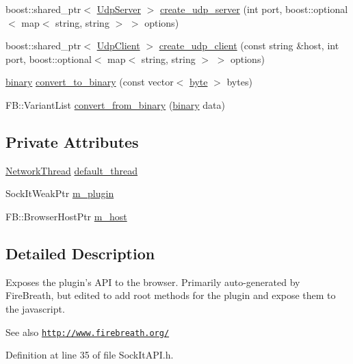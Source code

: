 \begin{DoxyCompactItemize}
\item 
boost::shared\_\-ptr$<$ \hyperlink{classUdpServer}{UdpServer} $>$ \hyperlink{classSockItAPI_afede6ca76e58e088b3262b02bb47d1a0}{create\_\-udp\_\-server} (int port, boost::optional$<$ map$<$ string, string $>$ $>$ options)
\item 
boost::shared\_\-ptr$<$ \hyperlink{classUdpClient}{UdpClient} $>$ \hyperlink{classSockItAPI_a459c942a85f434e96dec5cdff753ed3a}{create\_\-udp\_\-client} (const string \&host, int port, boost::optional$<$ map$<$ string, string $>$ $>$ options)
\item 
\hyperlink{Event_8h_a42e68af8ed186972f3b40e079e28dfb1}{binary} \hyperlink{classSockItAPI_a5eac49bd5ad0cb5320cbc325a0e997be}{convert\_\-to\_\-binary} (const vector$<$ \hyperlink{Event_8h_ae0aa21f6bcb621fe36c2c962aa0452fe}{byte} $>$ bytes)
\item 
FB::VariantList \hyperlink{classSockItAPI_a4e507273c91d6509be9133a34c32ed3c}{convert\_\-from\_\-binary} (\hyperlink{Event_8h_a42e68af8ed186972f3b40e079e28dfb1}{binary} data)
\end{DoxyCompactItemize}
\subsection*{Private Attributes}
\begin{DoxyCompactItemize}
\item 
\hyperlink{classNetworkThread}{NetworkThread} \hyperlink{classSockItAPI_adcfb54795f58d245c1b8ea8311a7d456}{default\_\-thread}
\item 
SockItWeakPtr \hyperlink{classSockItAPI_ac973fa980fa71d06190969448621beea}{m\_\-plugin}
\item 
FB::BrowserHostPtr \hyperlink{classSockItAPI_afb9c76de5331308b066e969d9a35d236}{m\_\-host}
\end{DoxyCompactItemize}


\subsection{Detailed Description}
Exposes the plugin's API to the browser. Primarily auto-\/generated by FireBreath, but edited to add root methods for the plugin and expose them to the javascript.

\begin{DoxySeeAlso}{See also}
\href{http://www.firebreath.org/}{\tt http://www.firebreath.org/} 
\end{DoxySeeAlso}


Definition at line 35 of file SockItAPI.h.



